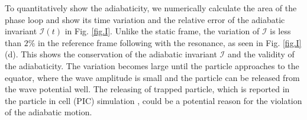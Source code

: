 To quantitatively show the adiabaticity, we numerically calculate the area of the phase loop and show its time variation 
and the relative error of the adiabatic invariant $\mathcal{I}(t)$ in Fig. \ref{fig.I}.
Unlike the static frame, the variation of $\mathcal{I}$ is less than $2\%$ in the reference frame following with the resonance,
as seen in Fig. \ref{fig.I}(d). 
This shows the conservation of the adiabatic invariant $\mathcal{I}$ and the validity of the adiabaticity. 
The variation becomes large until the particle approaches to the equator, where the wave amplitude is  small and the particle can be released from the wave potential well. 
The releasing of trapped particle, which is reported in the particle in cell (PIC) simulation \cite{tao_trap-release-amplify_2021}, could be a potential reason for the violation of the adiabatic motion.

